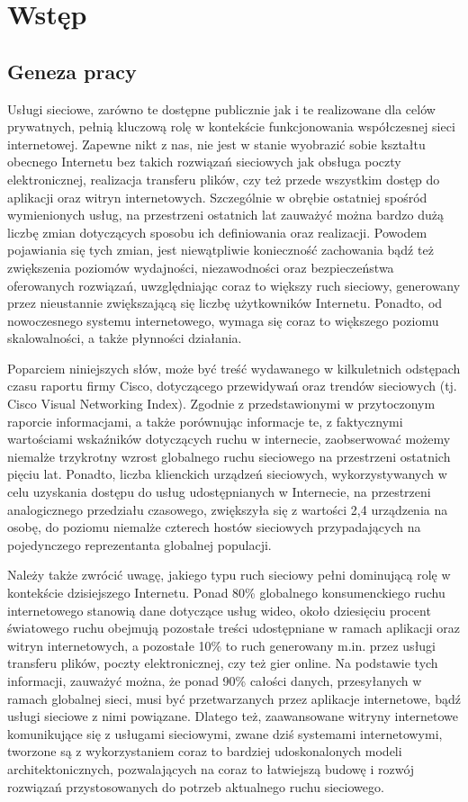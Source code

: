 \chapter{Wstęp}
\section{Geneza pracy}
Usługi sieciowe, zarówno te dostępne publicznie jak i te realizowane dla celów prywatnych, pełnią kluczową rolę w kontekście funkcjonowania współczesnej sieci internetowej. Zapewne nikt z nas, nie jest w stanie wyobrazić sobie kształtu obecnego Internetu bez takich rozwiązań sieciowych jak obsługa poczty elektronicznej, realizacja transferu plików, czy też przede wszystkim dostęp do aplikacji oraz witryn internetowych. Szczególnie w obrębie ostatniej spośród wymienionych usług, na przestrzeni ostatnich lat zauważyć można bardzo dużą liczbę zmian dotyczących sposobu ich definiowania oraz realizacji. Powodem pojawiania się tych zmian, jest niewątpliwie konieczność zachowania bądź też zwiększenia poziomów wydajności, niezawodności oraz bezpieczeństwa oferowanych rozwiązań, uwzględniając coraz to większy ruch sieciowy, generowany przez nieustannie zwiększającą się liczbę użytkowników Internetu. Ponadto, od nowoczesnego systemu internetowego, wymaga się coraz to większego poziomu skalowalności, a także płynności działania.

Poparciem niniejszych słów, może być treść wydawanego w kilkuletnich odstępach czasu raportu firmy Cisco, dotyczącego przewidywań oraz trendów sieciowych (tj. Cisco Visual Networking Index). Zgodnie z przedstawionymi w przytoczonym raporcie informacjami, a także porównując informacje te, z faktycznymi wartościami wskaźników dotyczących ruchu w internecie, zaobserwować możemy niemalże trzykrotny wzrost globalnego ruchu sieciowego na przestrzeni ostatnich pięciu lat. Ponadto, liczba klienckich urządzeń sieciowych, wykorzystywanych w celu uzyskania dostępu do usług udostępnianych w Internecie, na przestrzeni analogicznego przedziału czasowego, zwiększyła się z wartości 2,4 urządzenia na osobę, do poziomu niemalże czterech hostów sieciowych przypadających na pojedynczego reprezentanta globalnej populacji.

Należy także zwrócić uwagę, jakiego typu ruch sieciowy pełni dominującą rolę w kontekście dzisiejszego Internetu. Ponad 80\% globalnego konsumenckiego ruchu internetowego stanowią dane dotyczące usług wideo, około dziesięciu procent światowego ruchu obejmują pozostałe treści udostępniane w ramach aplikacji oraz witryn internetowych, a pozostałe 10\% to ruch generowany m.in. przez usługi transferu plików, poczty elektronicznej, czy też gier online. Na podstawie tych informacji, zauważyć można, że ponad 90\% całości danych, przesyłanych w ramach globalnej sieci, musi być przetwarzanych przez aplikacje internetowe, bądź usługi sieciowe z nimi powiązane. Dlatego też, zaawansowane witryny internetowe komunikujące się z usługami sieciowymi, zwane dziś systemami internetowymi, tworzone są z wykorzystaniem coraz to bardziej udoskonalonych modeli architektonicznych, pozwalających na coraz to łatwiejszą budowę i rozwój rozwiązań przystosowanych do potrzeb aktualnego ruchu sieciowego.

